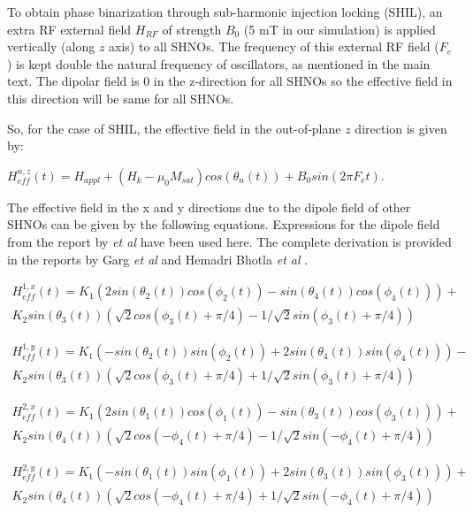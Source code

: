 \documentclass[10pt]{article}
\begin{document}
To obtain phase binarization through sub-harmonic injection locking (SHIL), an extra RF external field $H_{RF}$ of strength $B_0$ (5 mT in our simulation) is applied vertically (along $z$ axis) to all SHNOs. The frequency of this external RF field ($F_e$) is kept double the natural frequency of oscillators, as mentioned in the main text.
The dipolar field is 0 in the z-direction for all SHNOs so the effective field in this direction will be same for all SHNOs. 

So, for the case of SHIL, the effective field in the out-of-plane $z$ direction is given by:

$H_{eff}^{n,z}(t)=H_{appl}+(H_k-\mu_{0}M_{sat})cos(\theta_n(t))+B_{0}sin(2\pi F_{e} t)$.


The effective field in the x and y directions due to the dipole field of other SHNOs can be given by the following equations. Expressions for the dipole field from the report by \cite{Amin} \textit{et al} have been used here. The complete derivation is provided in the reports by Garg \textit{et al} \cite{Spin_DB1} and Hemadri Bhotla \textit{et al} \cite{Spin_DB2}.


\begin{multline}
H_{eff}^{1,x}(t) =  K_1 (2 sin(\theta_2(t)) cos(\phi_2(t)) -  sin(\theta_4(t)) cos(\phi_4(t))) + \\
              K_2 sin(\theta_3(t)) (\sqrt{2} cos(\phi_3(t) +  \pi/4) 
              - 1/\sqrt{2} sin(\phi_3(t) + \pi/4))
\label{RFfield_1x}    
\end{multline}



\begin{multline}
H_{eff}^{1,y}(t) = 
K_1 (- sin(\theta_2(t)) sin(\phi_2(t)) + 2 sin(\theta_4(t)) sin(\phi_4(t))) - \\
              K_2 sin(\theta_3(t)) (\sqrt{2} cos(\phi_3(t) + \pi/4) + 1/\sqrt{2} sin(\phi_3(t) + \pi/4))
\label{RFfield_1y}    
\end{multline}


\begin{multline}
H_{eff}^{2,x}(t) =  K_1 (2 sin(\theta_1(t)) cos(\phi_1(t)) -  sin(\theta_3(t)) cos(\phi_3(t))) + \\
              K_2 sin(\theta_4(t)) (\sqrt{2} cos(-\phi_4(t) +  \pi/4) 
              - 1/\sqrt{2} sin(-\phi_4(t) + \pi/4))
\label{RFfield_2x}    
\end{multline}



\begin{multline}
H_{eff}^{2,y}(t) = 
K_1 (- sin(\theta_1(t)) sin(\phi_1(t)) + 2 sin(\theta_3(t)) sin(\phi_3(t))) + \\
              K_2 sin(\theta_4(t)) (\sqrt{2} cos(-\phi_4(t) + \pi/4) + 1/\sqrt{2} sin(-\phi_4(t) + \pi/4))
\label{RFfield_2y}    
\end{multline}
\end{document}
